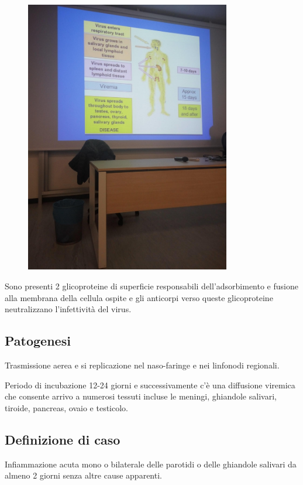 \begin{figure}[!ht]
\centering
	\includegraphics[width=0.8\textwidth]{07/image2.jpeg}
	\end{figure}

Sono
presenti 2 glicoproteine di superficie responsabili dell'adsorbimento e
fusione alla membrana della cellula ospite e gli anticorpi verso queste
glicoproteine neutralizzano l'infettività del virus.

\subsection{Patogenesi}

Trasmissione aerea e si replicazione nel naso-faringe e nei linfonodi
regionali.

Periodo di incubazione 12-24 giorni e successivamente c'è una diffusione
viremica che consente arrivo a numerosi tessuti incluse le meningi,
ghiandole salivari, tiroide, pancreas, ovaio e testicolo.

\subsection{Definizione di caso}

Infiammazione acuta mono o bilaterale delle parotidi o delle ghiandole
salivari da almeno 2 giorni senza altre cause apparenti.


